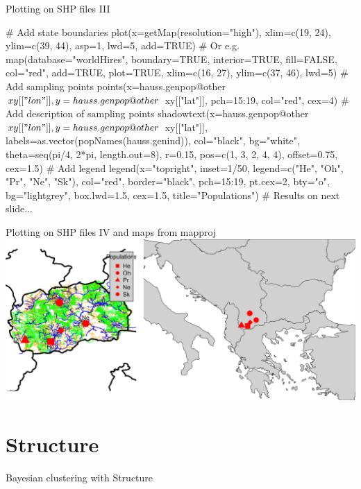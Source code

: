 \documentclass[compress, ucs, xelatex, 11pt, xcolor=svgnames,
	hyperref={
		bookmarks=true,
		unicode=true,
		colorlinks=true,
		pdftitle={Molecular data in R},
		plainpages=false,
		pdfauthor={Vojtech Zeisek},
		pdfsubject={Course about phylogeny and evolution in R},
		pdfcreator={XeLaTeX},
		pdfkeywords={R, evolution, phylogeny, molecular data},
		linkcolor=Tomato,
		anchorcolor=SaddleBrown,
		citecolor=Goldenrod,
		filecolor=DarkMagenta,
		menucolor=Sienna,
		urlcolor=DarkTurquoise,
		pdftex},
	url={hyphens, lowtilde} %
	]{beamer}
\begin{document}
\begin{frame}[fragile]{Plotting on SHP files III}
	\begin{spluscode}
    # Add state boundaries
    plot(x=getMap(resolution="high"), xlim=c(19, 24), ylim=c(39, 44), asp=1,
      lwd=5, add=TRUE) # Or e.g.
    map(database="worldHires", boundary=TRUE, interior=TRUE, fill=FALSE,
      col="red", add=TRUE, plot=TRUE, xlim=c(16, 27), ylim=c(37, 46), lwd=5)
    # Add sampling points
    points(x=hauss.genpop@other$xy[["lon"]], y=hauss.genpop@other$
      xy[["lat"]], pch=15:19, col="red", cex=4)
    # Add description of sampling points
    shadowtext(x=hauss.genpop@other$xy[["lon"]], y=hauss.genpop@other$
      xy[["lat"]], labels=as.vector(popNames(hauss.genind)), col="black",
      bg="white", theta=seq(pi/4, 2*pi, length.out=8), r=0.15,
      pos=c(1, 3, 2, 4, 4), offset=0.75, cex=1.5)
    # Add legend
    legend(x="topright", inset=1/50, legend=c("He", "Oh", "Pr", "Ne",
      "Sk"), col="red", border="black", pch=15:19, pt.cex=2, bty="o",
      bg="lightgrey", box.lwd=1.5, cex=1.5, title="Populations")
    # Results on next slide...
	\end{spluscode}
\end{frame}

\begin{frame}{Plotting on SHP files IV and maps from mapproj}
	\includegraphics[width=\textwidth]{mapy.png}
\end{frame}

\section{Structure}

\begin{frame}{Bayesian clustering with Structure}
	\tableofcontents[currentsection, sectionstyle=show/hide, hideothersubsections]
\end{frame}
\end{document}
